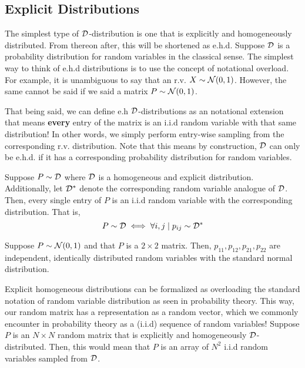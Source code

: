 
\subsection{Explicit Distributions}


The simplest type of $\mathcal{D}$-distribution is one that is explicitly and homogeneously distributed. From thereon after, this will be shortened as e.h.d.
Suppose $\mathcal{D}$ is a probability distribution for random variables in the classical sense. The simplest way to think of e.h.d distributions is to use the concept of notational overload.
For example, it is unambiguous to say that an r.v. $X \sim \mathcal{N}(0,1)$. However, the same cannot be said if we said a matrix $P \sim \mathcal{N}(0,1)$.

That being said, we can define e.h $\mathcal{D}$-distributions as an notational extension that means \textbf{every} entry of the matrix is an i.i.d random variable with that same distribution!
In other words, we simply perform entry-wise sampling from the corresponding r.v. distribution. Note that this means by construction, $\mathcal{D}$ can only be e.h.d. if it has a corresponding probability distribution for random variables.

\begin{definition}
Suppose $P \sim \mathcal{D}$ where $\mathcal{D}$ is a homogeneous and explicit distribution. Additionally, let $\mathcal{D}^*$ denote the corresponding random variable analogue of $\mathcal{D}$.
Then, every single entry of $P$ is an i.i.d random variable with the corresponding distribution. That is,
$$ P \sim \mathcal{D} \iff \forall i,j \mid p_{ij} \sim \mathcal{D}^* $$
\end{definition}

\begin{example}
Suppose $P \sim \mathcal{N}(0,1)$ and that $P$ is a $2 \times 2$ matrix.
Then, $p_{11}, p_{12}, p_{21}, p_{22}$ are independent, identically distributed random variables with the standard normal distribution.
\end{example}

\ALGexplicit

\begin{formalization}
Explicit homogeneous distributions can be formalized as overloading the standard notation of random variable distribution as seen in probability theory.
This way, our random matrix has a representation as a random vector, which we commonly encounter in probability theory as a (i.i.d) sequence of random variables!
Suppose $P$ is an $N \times N$ random matrix that is explicitly and homogeneously $\mathcal{D}$-distributed. Then, this would mean that $P$ is an array of $N^2$ i.i.d random variables sampled from $\mathcal{D}$.
\end{formalization}

